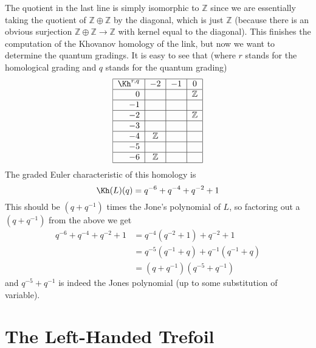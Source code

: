 The quotient in the last line is simply isomorphic to $\mathbb Z$ since we are essentially taking the quotient of $\mathbb Z \oplus \mathbb Z$ by the diagonal, which is just $\mathbb Z$ (because there is an obvious surjection $\mathbb Z \oplus \mathbb Z \rightarrow \mathbb Z$ with kernel equal to the diagonal). This finishes the computation of the Khovanov homology of the link, but now we want to determine the quantum gradings. It is easy to see that (where $r$ stands for the homological grading and $q$ stands for the quantum grading)
\[
\begin{tabular}{|r|c|c|c|}
\hline
$\Kh^{r,q}$ & $-2$ & $-1$ & $0$ \\
\hline
$0$ & & & $\mathbb Z$  \\
\hline
$-1$ & & &   \\
\hline
$-2$ & & & $\mathbb Z$  \\
\hline
$-3$ & & &   \\
\hline
$-4$ & $\mathbb Z$ &    &   \\
\hline
$-5$ & &    &   \\
\hline
$-6$ & $\mathbb Z$ &    &   \\
\hline
\end{tabular}
\]
The graded Euler characteristic of this homology is
\[ \Kh(L)(q) = q^{-6} + q^{-4} + q^{-2} + 1 \]
This should be $(q+q^{-1})$ times the Jone's polynomial of $L$, so factoring out a $(q+q^{-1})$ from the above we get
\begin{align*}
	q^{-6} + q^{-4} + q^{-2} + 1 &= q^{-4}(q^{-2} + 1) + q^{-2} + 1 \\
	                             &= q^{-5}(q^{-1} + q) + q^{-1}(q^{-1} + q) \\
	                             &= (q+q^{-1})(q^{-5} + q^{-1})
\end{align*}
and $q^{-5} + q^{-1}$ is indeed the Jones polynomial (up to some substitution of variable).



\section{The Left-Handed Trefoil}

